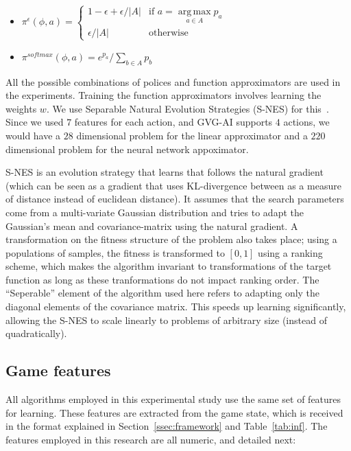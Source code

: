 \documentclass[conference]{IEEEtran}
\DeclareMathOperator*{\argmax}{arg\,max}
\newcommand{\twopartdefo}[3]
{
  \left\{
    \begin{array}{ll}
      #1 & \mbox{if } #2 \\
      #3 & \mbox{otherwise}
    \end{array}
  \right.
}
\begin{document}
\begin{itemize}
\item $\pi^\epsilon(\phi,a) = \twopartdefo{ 1-\epsilon + \epsilon/|A| }{ a = \argmax\limits_{a \in A}  p_a}{\epsilon/|A|}$
\item $\pi^{softmax}(\phi,a) = e^{p_a}/ \sum\limits_{b \in A} p_b $
\end{itemize}

All the possible combinations of polices and function approximators are used in the experiments. Training the function approximators involves learning the weights $w$. We use Separable Natural Evolution Strategies (S-NES) for this~\cite{schaul2011high}. Since we used $7$ features for each action, and GVG-AI supports $4$ actions, we would have a $28$ dimensional problem for the linear approximator and a $220$ dimensional problem for the neural network appoximator.  

S-NES is an evolution strategy that learns that follows the natural gradient (which can be seen as a gradient that uses KL-divergence between as a measure of distance instead of euclidean distance). It assumes that the search parameters come from a multi-variate Gaussian distribution and tries to adapt the Gaussian's mean and covariance-matrix using the natural gradient. A transformation on the fitness structure of the problem also takes place; using a populations of samples, the fitness is transformed to $[0,1]$ using a ranking scheme, which makes the algorithm invariant to transformations of the target function as long as these tranformations do not impact ranking order. The ``Seperable'' element of the algorithm used here refers to adapting only the diagonal elements of the covariance matrix. This speeds up learning significantly, allowing the S-NES to scale linearly to problems of arbitrary size (instead of quadratically). 

\subsection{Game features} \label{ssec:feat}

All algorithms employed in this experimental study use the same set of features for learning. These features are  extracted from the game state, which is received in the format explained in Section~\ref{ssec:framework} and Table~\ref{tab:inf}. The features employed in this research are all numeric, and detailed next:
\end{document}
